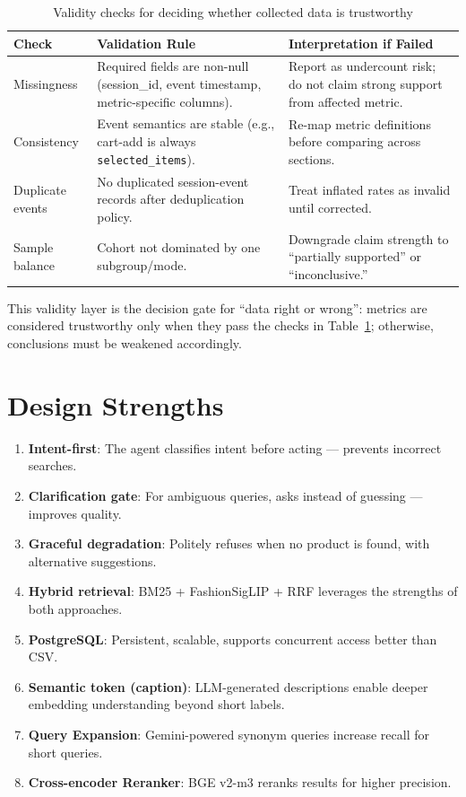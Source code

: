 \begin{table}[H]
\centering
\begin{tabular}{p{4.0cm}p{4.7cm}p{5.0cm}}
\toprule
\textbf{Check} & \textbf{Validation Rule} & \textbf{Interpretation if Failed}\\
\midrule
Missingness & Required fields are non-null (session\_id, event timestamp, metric-specific columns). & Report as undercount risk; do not claim strong support from affected metric.\\
Consistency & Event semantics are stable (e.g., cart-add is always \texttt{selected\_items}). & Re-map metric definitions before comparing across sections.\\
Duplicate events & No duplicated session-event records after deduplication policy. & Treat inflated rates as invalid until corrected.\\
Sample balance & Cohort not dominated by one subgroup/mode. & Downgrade claim strength to ``partially supported'' or ``inconclusive.''\\
\bottomrule
\end{tabular}
\caption{Validity checks for deciding whether collected data is trustworthy}
\label{tab:data_validity_checks}
\end{table}

This validity layer is the decision gate for ``data right or wrong'': metrics are considered trustworthy only when they pass the checks in Table~\ref{tab:data_validity_checks}; otherwise, conclusions must be weakened accordingly.

\section{Design Strengths}
\begin{enumerate}
    \item \textbf{Intent-first}: The agent classifies intent before acting --- prevents incorrect searches.
    \item \textbf{Clarification gate}: For ambiguous queries, asks instead of guessing --- improves quality.
    \item \textbf{Graceful degradation}: Politely refuses when no product is found, with alternative suggestions.
    \item \textbf{Hybrid retrieval}: BM25 + FashionSigLIP + RRF leverages the strengths of both approaches.
    \item \textbf{PostgreSQL}: Persistent, scalable, supports concurrent access better than CSV.
    \item \textbf{Semantic token (caption)}: LLM-generated descriptions enable deeper embedding understanding beyond short labels.
    \item \textbf{Query Expansion}: Gemini-powered synonym queries increase recall for short queries.
    \item \textbf{Cross-encoder Reranker}: BGE v2-m3 reranks results for higher precision.
\end{enumerate}

